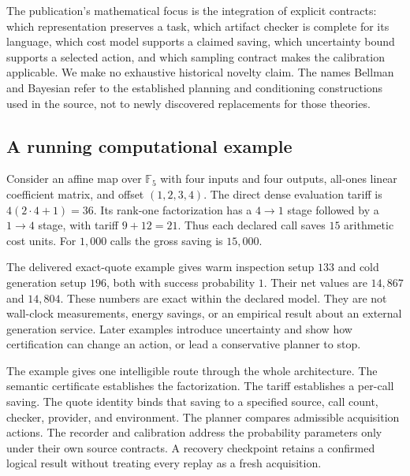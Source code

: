The publication's mathematical focus is the integration of explicit contracts: which representation preserves a task, which artifact checker is complete for its language, which cost model supports a claimed saving, which uncertainty bound supports a selected action, and which sampling contract makes the calibration applicable. We make no exhaustive historical novelty claim. The names Bellman and Bayesian refer to the established planning and conditioning constructions used in the source, not to newly discovered replacements for those theories.

\subsection{A running computational example}
Consider an affine map over $\mathbb F_5$ with four inputs and four outputs, all-ones linear coefficient matrix, and offset $(1,2,3,4)$. The direct dense evaluation tariff is $4(2\cdot4+1)=36$. Its rank-one factorization has a $4\to1$ stage followed by a $1\to4$ stage, with tariff $9+12=21$. Thus each declared call saves $15$ arithmetic cost units. For $1{,}000$ calls the gross saving is $15{,}000$.

The delivered exact-quote example gives warm inspection setup $133$ and cold generation setup $196$, both with success probability $1$. Their net values are $14{,}867$ and $14{,}804$. These numbers are exact within the declared model. They are not wall-clock measurements, energy savings, or an empirical result about an external generation service. Later examples introduce uncertainty and show how certification can change an action, or lead a conservative planner to stop.


The example gives one intelligible route through the whole architecture. The semantic certificate establishes the factorization. The tariff establishes a per-call saving. The quote identity binds that saving to a specified source, call count, checker, provider, and environment. The planner compares admissible acquisition actions. The recorder and calibration address the probability parameters only under their own source contracts. A recovery checkpoint retains a confirmed logical result without treating every replay as a fresh acquisition.
